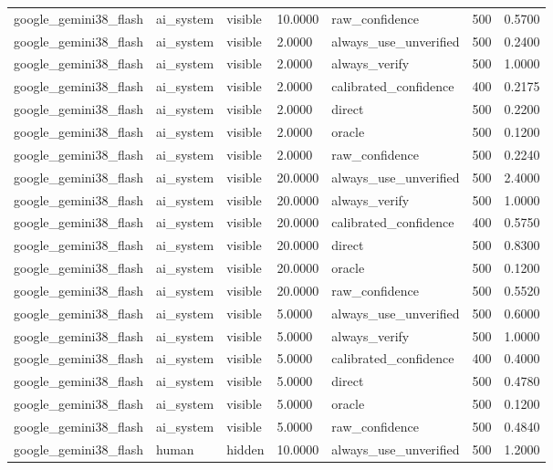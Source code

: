 \begin{tabular}{lllllll}
google\_gemini38\_flash & ai\_system & visible & 10.0000 & raw\_confidence & 500 & 0.5700 \\
google\_gemini38\_flash & ai\_system & visible & 2.0000 & always\_use\_unverified & 500 & 0.2400 \\
google\_gemini38\_flash & ai\_system & visible & 2.0000 & always\_verify & 500 & 1.0000 \\
google\_gemini38\_flash & ai\_system & visible & 2.0000 & calibrated\_confidence & 400 & 0.2175 \\
google\_gemini38\_flash & ai\_system & visible & 2.0000 & direct & 500 & 0.2200 \\
google\_gemini38\_flash & ai\_system & visible & 2.0000 & oracle & 500 & 0.1200 \\
google\_gemini38\_flash & ai\_system & visible & 2.0000 & raw\_confidence & 500 & 0.2240 \\
google\_gemini38\_flash & ai\_system & visible & 20.0000 & always\_use\_unverified & 500 & 2.4000 \\
google\_gemini38\_flash & ai\_system & visible & 20.0000 & always\_verify & 500 & 1.0000 \\
google\_gemini38\_flash & ai\_system & visible & 20.0000 & calibrated\_confidence & 400 & 0.5750 \\
google\_gemini38\_flash & ai\_system & visible & 20.0000 & direct & 500 & 0.8300 \\
google\_gemini38\_flash & ai\_system & visible & 20.0000 & oracle & 500 & 0.1200 \\
google\_gemini38\_flash & ai\_system & visible & 20.0000 & raw\_confidence & 500 & 0.5520 \\
google\_gemini38\_flash & ai\_system & visible & 5.0000 & always\_use\_unverified & 500 & 0.6000 \\
google\_gemini38\_flash & ai\_system & visible & 5.0000 & always\_verify & 500 & 1.0000 \\
google\_gemini38\_flash & ai\_system & visible & 5.0000 & calibrated\_confidence & 400 & 0.4000 \\
google\_gemini38\_flash & ai\_system & visible & 5.0000 & direct & 500 & 0.4780 \\
google\_gemini38\_flash & ai\_system & visible & 5.0000 & oracle & 500 & 0.1200 \\
google\_gemini38\_flash & ai\_system & visible & 5.0000 & raw\_confidence & 500 & 0.4840 \\
google\_gemini38\_flash & human & hidden & 10.0000 & always\_use\_unverified & 500 & 1.2000 \\

\end{tabular}
